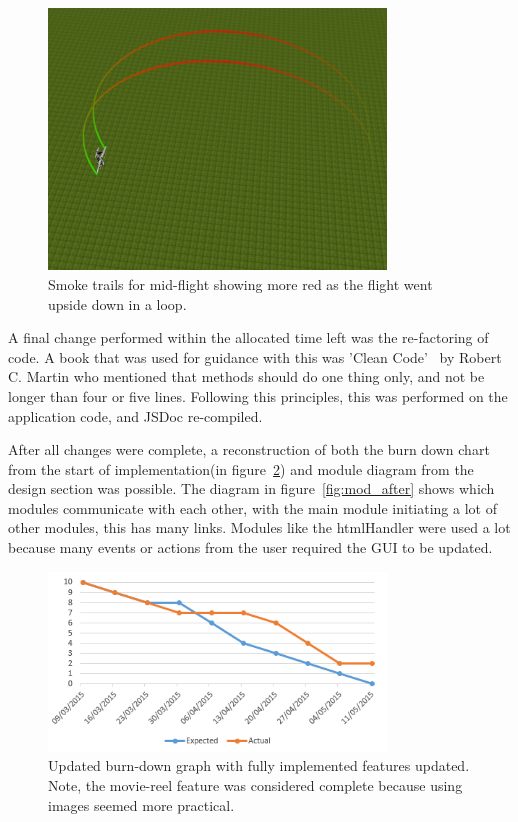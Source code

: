 \begin{figure}[h!]
  \centering
  \includegraphics[width=0.8\textwidth]{images/smoke.png}
  \caption{Smoke trails for mid-flight showing more red as the flight went upside down in a loop.}
  \label{fig:smoke}
\end{figure}

A final change performed within the allocated time left was the re-factoring of code. A book that was used for guidance with this was 'Clean Code'~\cite{clean_code} by Robert C. Martin who mentioned that methods should do one thing only, and not be longer than four or five lines. Following this principles, this was performed on the application code, and JSDoc re-compiled.

After all changes were complete, a reconstruction of both the burn down chart from the start of implementation(in figure~\ref{fig:newburndown}) and module diagram from the design section was possible. The diagram in figure~\ref{fig:mod_after} shows which modules communicate with each other, with the main module initiating a lot of other modules, this has many links. Modules like the htmlHandler were used a lot because many events or actions from the user required the GUI to be updated.

\begin{figure}[h!]
  \centering
      \includegraphics[width=0.8\textwidth]{images/burndownnew.png}
  \caption{Updated burn-down graph with fully implemented features updated. Note, the movie-reel feature was considered complete because using images seemed more practical.}
  \label{fig:newburndown}
\end{figure}


